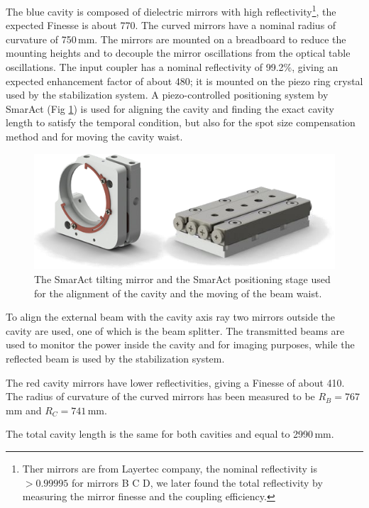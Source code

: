 The blue cavity is composed of dielectric mirrors with high reflectivity\footnote{Ther mirrors are from Layertec company, the nominal reflectivity is $>0.99995$ for mirrors B C D, we later found the total reflectivity by measuring the mirror finesse and the coupling efficiency.}, the expected Finesse is about 770. The curved mirrors have a nominal radius of curvature of 750\,mm. The mirrors are mounted on a breadboard to reduce the mounting heights and to decouple the mirror oscillations from the optical table oscillations. The input coupler has a nominal reflectivity of 99.2\%, giving an expected enhancement factor of about 480; it is mounted on the piezo ring crystal used by the stabilization system. A piezo-controlled positioning system by SmarAct (Fig \ref{fig:smaract}) is used for aligning the cavity and finding the exact cavity length to satisfy the temporal condition, but also for the spot size compensation method and for moving the cavity waist.
\begin{figure}
	\centering
	\includegraphics[width=0.9\linewidth]{images/smaract.png}
	\caption{The SmarAct tilting mirror and the SmarAct positioning stage used for the alignment of the cavity and the moving of the beam waist.}
	\label{fig:smaract}
\end{figure}
To align the external beam with the cavity axis ray two mirrors outside the cavity are used, one of which is the beam splitter. The transmitted beams are used to monitor the power inside the cavity and for imaging purposes, while the reflected beam is used by the stabilization system.

The red cavity mirrors have lower reflectivities, giving a Finesse of about 410. The radius of curvature of the curved mirrors has been measured to be $R_B = 767$\,mm and $R_C = 741$\,mm.

The total cavity length is the same for both cavities and equal to 2990\,mm.

